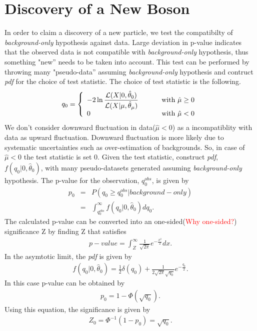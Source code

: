 \section{Discovery of a New Boson}
In order to claim a discovery of a new particle, we test the compatibilty of 
\textit{background-only} hypothesis against data. Large deviation in p-value 
indicates that the observed data is not compatible with \textit{background-only} 
hypothesis, thus something "new'' needs to be taken into account. 
This test can be performed by throwing many "pseudo-data'' assuming 
\textit{background-only} hypothesis and contruct \textit{pdf} for the choice 
of test statistic. The choice of test statistic is the following. 
\begin{eqnarray} 
q_0
=
\left\{ \begin{array}{l l}
\displaystyle
-2 \ln \frac{\mathcal{L}( X | 0, \hat{\theta}_0)}
            {\mathcal{L}( X | \mu, \hat{\theta}_\mu)} 
             & \qquad \textrm{ with } \hat{\mu} \ge 0 \\   
0 
             & \qquad \textrm{ with } \hat{\mu} < 0    
\end{array} \right.
\end{eqnarray} 
We don't consider downward fluctuation in data($\hat{\mu} < 0$) as a 
incompatiblity with data as upward fluctuation. Downward fluctuation 
is more likely due to systematic uncertainties such as over-estimation 
of backgrounds. So, in case of $\hat{\mu} < 0$ the test statistic is 
set 0. Given the test statistic, construct \textit{pdf}, $f(q_0|0,\hat{\theta}_0)$, 
with many pseudo-datasets generated assuming \textit{background-only} hypothesis.
The p-value for the observation, $q_0^{obs}$, is given by 
\begin{eqnarray} 
p_0
&=& P \left( q_0 \ge q_0^{obs} | background-only \right)  \\
&=& \int^{\infty}_{ q_0^{obs} }  f\left( q_0 | 0, \hat{\theta}_0 \right) dq_0.
\end{eqnarray} 
The calculated p-value can be converted into an one-sided(\textcolor{red}{Why one-sided?}) 
significance Z by finding Z that satisfies 
\begin{eqnarray} 
p-value 
= 
\int^{\infty}_{Z} \frac{1}{\sqrt{2\pi}} e^{ -\frac{x^2}{2}} dx.   
\end{eqnarray} 
In the asymtotic limit, the \textit{pdf} is given by 
\begin{eqnarray} 
f\left(q_0 | 0, \hat{\theta}_0 \right) 
= 
\frac{1}{2} \delta \left(q_0\right)  
+ 
\frac{1}{2\sqrt{2\pi}\sqrt{q_0}} e^{-\frac{q_0}{2}}.
\end{eqnarray} 
In this case p-value can be obtained by 
\begin{eqnarray}
p_0 = 1 - \Phi \left( \sqrt{q_0} \right).
\end{eqnarray} 
Using this equation, the significance is given by  
\begin{eqnarray} 
Z_0 = \Phi^{-1} \left( 1 - p_0 \right) = \sqrt{q_0}.
\end{eqnarray} 

